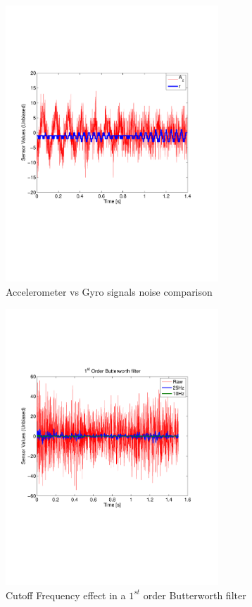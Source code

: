 \documentclass{article}
\begin{document}
\begin{figure}[ht]
\centering
	\begin{subfigure}[b]{0.49\textwidth}
  		\includegraphics[width=8cm]{Figures/Noise.pdf}
		\caption{Accelerometer vs Gyro signals noise comparison}
		\label{fig.Noise}
  \end{subfigure}
	\begin{subfigure}[b]{0.49\textwidth}	
		\includegraphics[width=8cm]{Figures/NoiseComp.pdf}
		\caption{Cutoff Frequency effect in a $1^{st}$ order Butterworth filter}
		\label{fig.NoiseComp}
	\end{subfigure}
	\caption{}
\end{figure}
\end{document}
